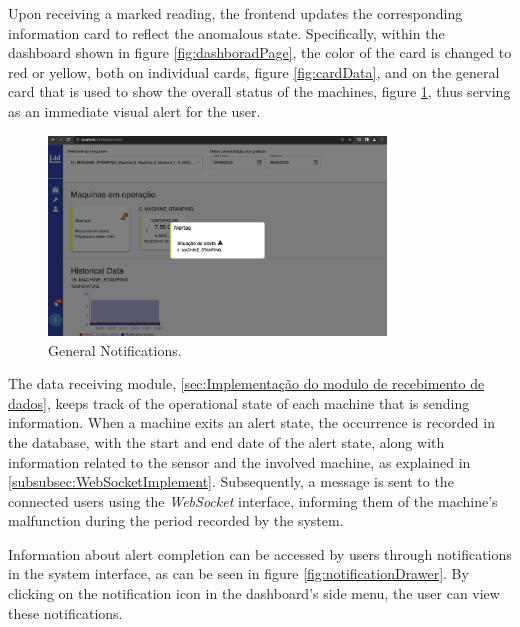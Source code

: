 Upon receiving a marked reading, the frontend updates the corresponding information card to reflect the anomalous state. Specifically, within the dashboard shown in figure \ref{fig:dashboradPage}, the color of the card is changed to red or yellow, both on individual cards, figure \ref{fig:cardData}, and on the general card that is used to show the overall status of the machines, figure \ref{fig:geralMachineAlert}, thus serving as an immediate visual alert for the user.

\begin{figure}[htbp]
	\centering
	\includegraphics[width=0.8\textwidth]{images/geralMachineAlert.png}
	\caption{General Notifications.}
	\label{fig:geralMachineAlert}
\end{figure}

The data receiving module, \ref{sec:Implementação do modulo de recebimento de dados}, keeps track of the operational state of each machine that is sending information. When a machine exits an alert state, the occurrence is recorded in the database, with the start and end date of the alert state, along with information related to the sensor and the involved machine, as explained in \ref{subsubsec:WebSocketImplement}. Subsequently, a message is sent to the connected users using the \textit{WebSocket} interface, informing them of the machine's malfunction during the period recorded by the system.

Information about alert completion can be accessed by users through notifications in the system interface, as can be seen in figure \ref{fig:notificationDrawer}. By clicking on the notification icon in the dashboard's side menu, the user can view these notifications.

